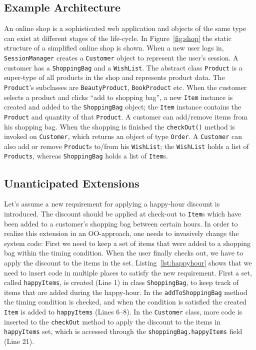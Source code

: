 \subsection{Example Architecture}
An online shop is a sophisticated web application and objects of the same type can exist at different stages of the life-cycle. In Figure~\ref{fig:shop} the static structure of a simplified online shop is shown. When a new user logs in, \texttt{SessionManager} creates a \texttt{Customer} object to represent the user's session. A customer has a \texttt{ShoppingBag} and a \texttt{WishList}. The abstract class \texttt{Product} is a super-type of all products in the shop and represents product data. The \texttt{Product}'s subclasses are \texttt{BeautyProduct}, \texttt{BookProduct} etc. When the customer selects a product and clicks ``add to shopping bag'', a new \texttt{Item} instance is created and added to the \texttt{ShoppingBag} object; the \texttt{Item} instance contains the \texttt{Product} and quantity of that \texttt{Product}. A customer can add/remove items from his shopping bag. When the shopping is finished the \texttt{checkOut()} method is invoked on \texttt{Customer}, which returns an object of type \texttt{Order}. A \texttt{Customer} can also add or remove \texttt{Product}s to/from his \texttt{WishList}; the \texttt{WishList} holds a list of \texttt{Products}, whereas \texttt{ShoppingBag} holds a list of \texttt{Item}s.

\subsection{Unanticipated Extensions}
Let's assume a new requirement for applying a happy-hour discount is introduced. The discount should be applied at check-out to \texttt{Item}s which have been added to a customer's shopping bag between certain hours.
In order to realize this extension in an OO-approach, one needs to invasively change the system code: First we need to keep a set of items that were added to a shopping bag within the timing condition. When the user finally checks out, we have to apply the discount to the items in the set. Listing~\ref{lst:happyhour} shows that we need to insert code in multiple places to satisfy the new requirement. First a set, called \texttt{happyItems}, is created (Line 1) in class \texttt{ShoppingBag}, to keep track of items that are added during the happy-hour. In the \texttt{addToShoppingBag} method the timing condition is checked, and when the condition is satisfied the created \texttt{Item} is added to \texttt{happyItems} (Lines 6--8).  In the \texttt{Customer} class, more code is inserted to the \texttt{checkOut} method to apply the discount to the items in \texttt{happyItems} set, which is accessed through the \texttt{shoppingBag.happyItems} field (Line 21). 

